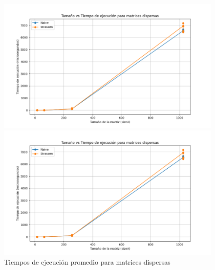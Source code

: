 \begin{figure}[H]
    \centering
    \begin{minipage}[t]{0.5\textwidth}
        \includegraphics[width=\textwidth]{../code/matrix_multiplication/data/plots/sparse_matrices_plot.png}
    \end{minipage}%
    \begin{minipage}[t]{0.5\textwidth}
        \includegraphics[width=\textwidth]{../code/matrix_multiplication/data/plots/sparse_matrices_plot.png}
     \end{minipage}%
    \caption{Tiempos de ejecución promedio para matrices dispersas}
    \label{fig:multi_dispersa}
\end{figure}